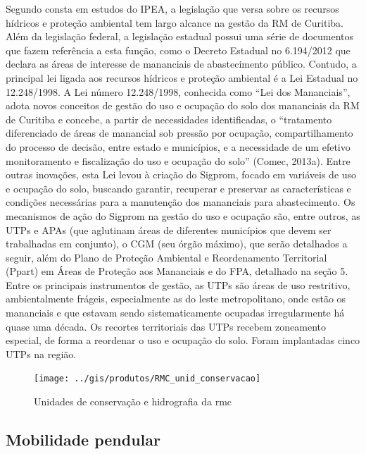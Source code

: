 	Segundo consta em estudos do IPEA, a legislação que versa sobre os recursos hídricos e proteção ambiental tem largo alcance na gestão da RM de Curitiba. Além da legislação federal, a legislação estadual possui uma série de documentos que fazem referência a esta função, como o Decreto Estadual no 6.194/2012 que declara as áreas de interesse de mananciais de abastecimento público. Contudo, a principal lei ligada aos recursos hídricos e proteção ambiental é a Lei Estadual no 12.248/1998. A Lei número 12.248/1998, conhecida como ``Lei dos Mananciais'', adota novos conceitos de gestão do uso e ocupação do solo dos mananciais da RM de Curitiba e concebe, a partir de necessidades identificadas, o ``tratamento diferenciado de áreas de manancial sob pressão por ocupação, compartilhamento do processo de decisão, entre estado e municípios, e a necessidade de um efetivo monitoramento e fiscalização do uso e ocupação do solo'' (Comec, 2013a). Entre outras inovações, esta Lei levou à criação do Sigprom, focado em variáveis de uso e ocupação do solo, buscando garantir, recuperar e preservar as características e condições necessárias para a manutenção dos mananciais para abastecimento. Os mecanismos de ação do Sigprom na gestão do uso e ocupação são, entre outros, as UTPs e APAs (que aglutinam áreas de diferentes municípios que devem ser trabalhadas em conjunto), o CGM (seu órgão máximo), que serão detalhados a seguir, além do Plano de Proteção Ambiental e Reordenamento Territorial (Ppart) em Áreas de Proteção aos Mananciais e do FPA, detalhado na seção 5. Entre os principais instrumentos de gestão, as UTPs são áreas de uso restritivo, ambientalmente frágeis, especialmente as do leste metropolitano, onde estão os mananciais e que estavam sendo sistematicamente ocupadas irregularmente há quase uma década. Os recortes territoriais das UTPs recebem zoneamento especial, de forma a reordenar o uso e ocupação do solo. Foram implantadas cinco UTPs na região.
	
	\begin{landscape}
		\begin{figure}
			\centering
			\caption{Unidades de conservação e hidrografia da \glsdesc{rmc}}
			\label{fig:rmcconservacao}
			\texttt{[image: ../gis/produtos/RMC\_unid\_conservacao]}
		\end{figure}
	\end{landscape}
	
	\subsection{Mobilidade pendular}
	
